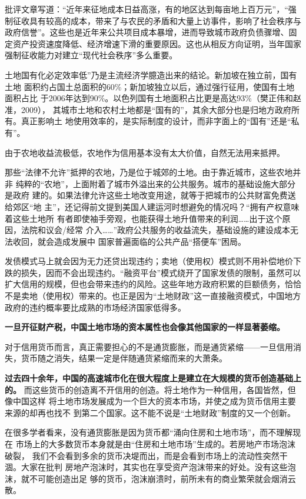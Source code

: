 批评文章写道：“近年来征地成本日益高涨，有的地区达到每亩地上百万元”，“强制征收具有较高的成本，带来了与农民的矛盾和大量上访事件，影响了社会秩序与政府信誉”。这些也是近年来公共项目成本暴增，进而导致城市政府负债骤增、固定资产投资速度降低、经济增速下滑的重要原因。这也从相反方向证明，当年国家强制征收能力对建立“现代社会秩序”多么重要。

土地国有化必定效率低”乃是主流经济学臆造出来的结论。新加坡在独立前，国有土地
面积约占国土总面积的60\%；新加坡独立以后，通过强行征用，使国有土地面积占比
于2006年达到90\%。以色列国有土地面积占比更是高达93\%（樊正伟和赵准，2009），
其城市土地和农村土地都是“国有的”，其余大部分也是归地方政府所有。真正影响土
地使用效率的，是实际制度的设计，而非字面上的“国有”还是“私有”。


由于农地收益流极低，农地作为信用基本没有太大价值，自然无法用来抵押。

那些“法律不允许”抵押的农地，乃是位于城郊的土地。由于靠近城市，这些农地并非
纯粹的“农地”，上面附着了城市外溢出来的公共服务。城市的基础设施大部分是政府
建的。如果法律允许这些土地改变用途，就等于把城市的公共财富免费送给郊区“地
主”，还记得前文提到美国人建运河时想避免的情况吗？“拥有产权意味着这些土地所
有者即使袖手旁观，也能获得土地升值带来的利润……出于这个原因，法院和议会/经常
介入……”政府公共服务的收益流失，基础设施的建设成本无法收回，就会造成发展中
国家普遍面临的公共产品“搭便车”困局。

发债模式马上就会因为无力还贷出现违约；卖地（使用权）模式则不用补偿地价下跌的损失，因而不会出现违约。“融资平台”模式绕开了国家发债的限制，虽然可以扩大信用的规模，但也会带来违约的风险。这些年地方政府积累的巨额债务，恰恰不是卖地（使用权）带来的。也正是因为“土地财政”这一直接融资模式，中国地方政府的违约概率要比成熟的市场经济国家低得多。


\textbf{一旦开征财产税，中国土地市场的资本属性也会像其他国家的一样显著萎缩。}

对于信用货币而言，真正需要担心的不是通货膨胀，而是通货紧缩——一旦信用消失，货币随之消失，结果一定是伴随通货紧缩而来的大萧条。

\textbf{过去四十余年，中国的高速城市化在很大程度上是建立在大规模的货币创造基础上的。}
而这些货币的创造离不开信用的创造。将土地作为一种信用，各国皆然，但像中国这样
将土地市场发展成为一个巨大的资本市场，并使之成为货币信用主要来源的却再也找不
到第二个国家。这不能不说是“土地财政”制度的又一个创新。

在很多学者看来，没有通货膨胀是因为货币都“涌向住房和土地市场”，而不理解现在
市场上的大多数货币本身就是由“住房和土地市场”生成的。若房地产市场泡沫破裂，
我们不会看到多余的货币决堤而出，而是会看到市场上的流动性突然干涸。大家在批判
房地产泡沫时，其实也在享受资产泡沫带来的好处。没有这些泡沫，就不可能创造出足
够的货币，泡沫崩溃时，前所未有的商业繁荣就会烟消云散。


